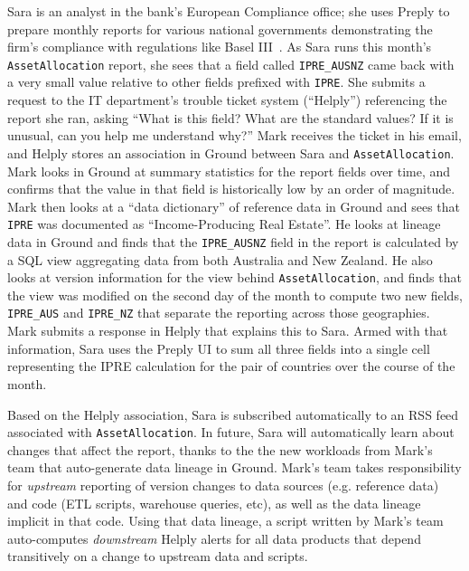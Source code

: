 \documentclass{sig-alternate}
\begin{document}
Sara is an analyst in the bank's European Compliance office; she uses Preply to prepare monthly reports for various national governments demonstrating the firm's compliance with regulations like Basel III~\cite{basel3}. As Sara runs this month's \texttt{AssetAllocation} report, she sees that a field called \texttt{IPRE\_AUSNZ} came back with a very small value relative to other fields prefixed with \texttt{IPRE}. She submits a request to the IT department's trouble ticket system (``Helply'') referencing the report she ran, asking ``What is this field? What are the standard values? If it is unusual, can you help me understand why?'' Mark receives the ticket in his email, and Helply stores an association in Ground between Sara and \texttt{AssetAllocation}. Mark looks in Ground at summary statistics for the report fields over time, and confirms that the value in that field is historically low by an order of magnitude. Mark then looks at a ``data dictionary'' of reference data in Ground and sees that \texttt{IPRE} was documented as ``Income-Producing Real Estate''. He looks at lineage data in Ground and finds that the \texttt{IPRE\_AUSNZ} field in the report is calculated by a SQL view aggregating data from both Australia and New Zealand. He also looks at version information for the view behind \texttt{AssetAllocation}, and finds that the view was modified on the second day of the month to compute two new fields, \texttt{IPRE\_AUS} and \texttt{IPRE\_NZ} that separate the reporting across those geographies. Mark submits a response in Helply that explains this to Sara. Armed with that information, Sara uses the Preply UI to sum all three fields into a single cell representing the IPRE calculation for the pair of countries over the course of the month.

Based on the Helply association, Sara is subscribed automatically to an RSS feed associated with \texttt{AssetAllocation}. In future, Sara will automatically learn about changes that affect the report, thanks to the the new workloads from Mark's team that auto-generate data lineage in Ground. Mark's team takes responsibility for \emph{upstream} reporting of version changes to data sources (e.g. reference data) and code (ETL scripts, warehouse queries, etc), as well as the data lineage implicit in that code.
Using that data lineage, a script written by Mark's team auto-computes \emph{downstream} Helply alerts for all data products that depend transitively on a change to upstream data and scripts.
\end{document}
